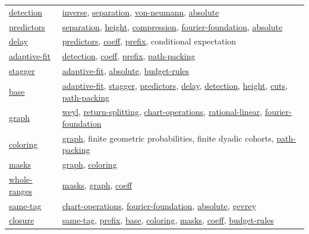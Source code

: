 \documentclass[11pt]{article}
\theoremstyle{definition}
\numberwithin{equation}{section}
\begin{document}
\begin{longtable}{@{}p{}p{}@{}}
\hyperlink{bp:detection}{detection} & \hyperlink{bp:inverse}{inverse}, \hyperlink{bp:separation}{separation}, \hyperlink{bp:von-neumann}{von-neumann}, \hyperlink{bp:absolute}{absolute}\\[3pt]
\hyperlink{bp:predictors}{predictors} & \hyperlink{bp:separation}{separation}, \hyperlink{bp:height}{height}, \hyperlink{bp:compression}{compression}, \hyperlink{bp:fourier-foundation}{fourier-foundation}, \hyperlink{bp:absolute}{absolute}\\[3pt]
\hyperlink{bp:delay}{delay} & \hyperlink{bp:predictors}{predictors}, \hyperlink{bp:coeff}{coeff}, \hyperlink{bp:prefix}{prefix}, conditional expectation\\[3pt]
\hyperlink{bp:adaptive-fit}{adaptive-fit} & \hyperlink{bp:detection}{detection}, \hyperlink{bp:coeff}{coeff}, \hyperlink{bp:prefix}{prefix}, \hyperlink{bp:path-packing}{path-packing}\\[3pt]
\hyperlink{bp:stagger}{stagger} & \hyperlink{bp:adaptive-fit}{adaptive-fit}, \hyperlink{bp:absolute}{absolute}, \hyperlink{bp:budget-rules}{budget-rules}\\[3pt]
\hyperlink{bp:base}{base} & \hyperlink{bp:adaptive-fit}{adaptive-fit}, \hyperlink{bp:stagger}{stagger}, \hyperlink{bp:predictors}{predictors}, \hyperlink{bp:delay}{delay}, \hyperlink{bp:detection}{detection}, \hyperlink{bp:height}{height}, \hyperlink{bp:cuts}{cuts}, \hyperlink{bp:path-packing}{path-packing}\\[3pt]
\hyperlink{bp:graph}{graph} & \hyperlink{bp:weyl}{weyl}, \hyperlink{bp:return-splitting}{return-splitting}, \hyperlink{bp:chart-operations}{chart-operations}, \hyperlink{bp:rational-linear}{rational-linear}, \hyperlink{bp:fourier-foundation}{fourier-foundation}\\[3pt]
\hyperlink{bp:coloring}{coloring} & \hyperlink{bp:graph}{graph}, finite geometric probabilities, finite dyadic cohorts, \hyperlink{bp:path-packing}{path-packing}\\[3pt]
\hyperlink{bp:masks}{masks} & \hyperlink{bp:graph}{graph}, \hyperlink{bp:coloring}{coloring}\\[3pt]
\hyperlink{bp:whole-ranges}{whole-ranges} & \hyperlink{bp:masks}{masks}, \hyperlink{bp:graph}{graph}, \hyperlink{bp:coeff}{coeff}\\[3pt]
\hyperlink{bp:same-tag}{same-tag} & \hyperlink{bp:chart-operations}{chart-operations}, \hyperlink{bp:fourier-foundation}{fourier-foundation}, \hyperlink{bp:absolute}{absolute}, \hyperlink{bp:gevrey}{gevrey}\\[3pt]
\hyperlink{bp:closure}{closure} & \hyperlink{bp:same-tag}{same-tag}, \hyperlink{bp:prefix}{prefix}, \hyperlink{bp:base}{base}, \hyperlink{bp:coloring}{coloring}, \hyperlink{bp:masks}{masks}, \hyperlink{bp:coeff}{coeff}, \hyperlink{bp:budget-rules}{budget-rules}\\[3pt]

\end{longtable}
\end{document}
